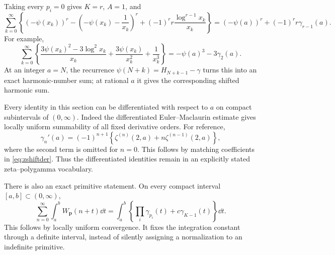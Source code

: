 Taking every $p_i=0$ gives $K=r$, $A=1$, and
\begin{equation}\label{eq:all-digamma}
 \sum_{k=0}^{\infty}
 \left\{(-\psi(x_k))^r-\left(-\psi(x_k)-\frac1{x_k}\right)^r
                  +(-1)^rr\frac{\log^{r-1}x_k}{x_k}\right\}
 =(-\psi(a))^r+(-1)^rr\gamma_{r-1}(a).
\end{equation}
For example,
\begin{equation}\label{eq:cubic-digamma}
 \sum_{k=0}^{\infty}\left\{
 \frac{3\psi(x_k)^2-3\log^2x_k}{x_k}
 +\frac{3\psi(x_k)}{x_k^2}+\frac1{x_k^3}\right\}
 =-\psi(a)^3-3\gamma_2(a).
\end{equation}
At an integer $a=N$, the recurrence
$\psi(N+k)=H_{N+k-1}-\gamma$ turns this into an exact harmonic-number
sum; at rational $a$ it gives the corresponding shifted harmonic sum.

Every identity in this section can be differentiated with respect to $a$
on compact subintervals of $(0,\infty)$. Indeed the differentiated
Euler--Maclaurin estimate gives locally uniform summability of all fixed
derivative orders. For reference,
\begin{equation}\label{eq:gamma-derivative}
 \gamma_n'(a)=(-1)^{n+1}
 \left\{\zeta^{(n)}(2,a)+n\zeta^{(n-1)}(2,a)\right\},
\end{equation}
where the second term is omitted for $n=0$. This follows by matching
coefficients in \eqref{eq:zshiftder}. Thus the differentiated identities
remain in an explicitly stated zeta--polygamma vocabulary.

There is also an exact primitive statement. On every compact interval
$[a,b]\subset(0,\infty)$,
\begin{equation}
 \sum_{n=0}^{\infty}\int_a^b W_{\boldsymbol p}(n+t)\dd t
 =\int_a^b\left\{\prod_i\gamma_{p_i}(t)+c\gamma_{K-1}(t)\right\}\dd t.
\end{equation}
This follows by locally uniform convergence. It fixes the integration
constant through a definite interval, instead of silently assigning a
normalization to an indefinite primitive.
